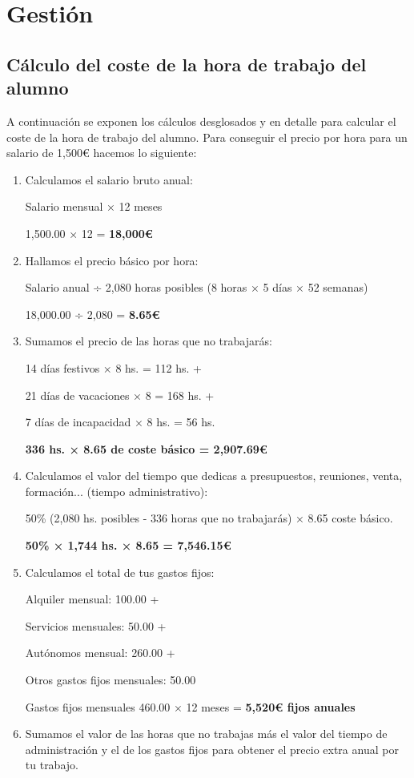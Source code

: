 \chapter{Gestión} \label{d.gestion}
\section{Cálculo del coste de la hora de trabajo del alumno} \label{d.gestion.estimacion}
A continuación se exponen los cálculos desglosados y en detalle para calcular el coste de la hora de trabajo del alumno. Para conseguir el precio por hora para un salario de 1,500€ hacemos lo siguiente:
\begin{enumerate}
\item Calculamos el salario bruto anual:

Salario mensual × 12 meses

1,500.00 × 12 = \textbf{18,000€}
\item Hallamos el precio básico por hora:

Salario anual ÷ 2,080 horas posibles (8 horas × 5 días × 52 semanas)

18,000.00 ÷ 2,080 = \textbf{8.65€}
\item Sumamos el precio de las horas que no trabajarás:

14 días festivos × 8 hs. = 112 hs. +

21 días de vacaciones × 8 = 168 hs. +

7 días de incapacidad × 8 hs. = 56 hs.

\textbf{336 hs. × 8.65 de coste básico = 2,907.69€}
\item Calculamos el valor del tiempo que dedicas a presupuestos, reuniones, venta, formación... (tiempo administrativo):

50\% (2,080 hs. posibles - 336 horas que no trabajarás) × 8.65 coste básico.

\textbf{50\% × 1,744 hs. × 8.65 = 7,546.15€}
\item Calculamos el total de tus gastos fijos:

Alquiler mensual: 100.00 +

Servicios mensuales: 50.00 +

Autónomos mensual: 260.00 +

Otros gastos fijos mensuales: 50.00

Gastos fijos mensuales 460.00 × 12 meses = \textbf{5,520€ fijos anuales}
\item Sumamos el valor de las horas que no trabajas más el valor del tiempo de administración y el de los gastos fijos para obtener el precio extra anual por tu trabajo.


\end{enumerate}
